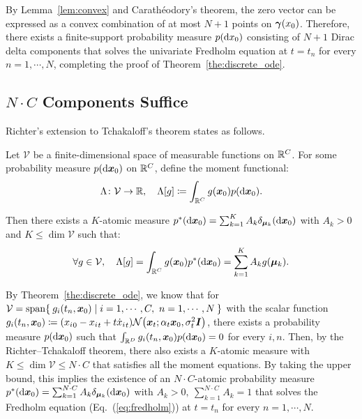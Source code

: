 By Lemma~\ref{lem:convex} and Carathéodory's theorem, the zero vector can be expressed as a convex combination of at most $N+1$ points on ${\bm{\gamma}}(x_0)$. Therefore, there exists a finite-support probability measure $p(\mathop{}\!\mathrm{d} x_0)$ consisting of $N+1$ Dirac delta components that solves the univariate Fredholm equation at $t=t_n$ for every $n=1,\cdots,N$, completing the proof of Theorem~\ref{the:discrete_ode}.

\subsection{\texorpdfstring{$N\cdot C$}{NC} Components Suffice}
Richter's extension to Tchakaloff's theorem states as follows.
\begin{theorem}
Let $\mathcal{V}$ be a finite-dimensional space of measurable functions on $\mathbb{R}^C$. For some probability measure $p(\mathop{}\!\mathrm{d} {\bm{x}}_0)$ on $\mathbb{R}^C$, define the moment functional:
\begin{align}
    \Lambda\colon \mathcal{V}\to \mathbb{R}, \quad \Lambda[g]\coloneqq \int_{\mathbb{R}^C} g({\bm{x}}_0) p(\mathop{}\!\mathrm{d} {\bm{x}}_0).
\end{align}
\label{the:richter}
\end{theorem}
Then there exists a $K$-atomic measure $p^\ast(\mathop{}\!\mathrm{d} {\bm{x}}_0) = \sum_{k=1}^K A_k \delta_{{\bm{\mu}}_k}(\mathop{}\!\mathrm{d} {\bm{x}}_0)$ with $A_k > 0$ and $K \leq \dim \mathcal{V}$ such that:
\begin{align}
    \forall g\in \mathcal{V}, \quad \Lambda[g] = \int_{\mathbb{R}^C} g({\bm{x}}_0)p^\ast(\mathop{}\!\mathrm{d} {\bm{x}}_0) = \sum_{k=1}^K A_k g({\bm{\mu}}_k). 
\end{align}

By Theorem~\ref{the:discrete_ode}, we know that for $\mathcal{V}=\mathrm{span}\Set{g_i(t_n, \vx_0)|i=1,\cdots,C,\ n=1,\cdots,N}$ with the scalar function $g_i(t_n, \vx_0) \coloneqq ({x_i}_0 - {x_i}_t + t{{}\dot{x}_i}_t) \mathcal{N}\left(\vx_t; \alpha_t \vx_0, \sigma_t^2 \mI\right)$, there exists a probability measure $p(\mathop{}\!\mathrm{d} {\bm{x}}_0)$ such that $\int_{\mathbb{R}^D} g_i(t_n, {\bm{x}}_0) p(\mathop{}\!\mathrm{d} {\bm{x}}_0) = 0$ for every $i,n$. Then, by the Richter--Tchakaloff theorem, there also exists a $K$-atomic measure with $K \leq \dim \mathcal{V} \leq N\cdot C$ that satisfies all the moment equations. By taking the upper bound, this implies the existence of an $N\cdot C$-atomic probability measure $p^\ast(\mathop{}\!\mathrm{d} {\bm{x}}_0) = \sum_{k=1}^{N\cdot C} A_k \delta_{{\bm{\mu}}_k}(\mathop{}\!\mathrm{d} {\bm{x}}_0)$ with $A_k > 0,\ \sum_{k=1}^{N\cdot C} A_k = 1$ that solves the Fredholm equation (Eq.~(\ref{eq:fredholm})) at $t=t_n$ for every $n=1,\cdots,N$.

